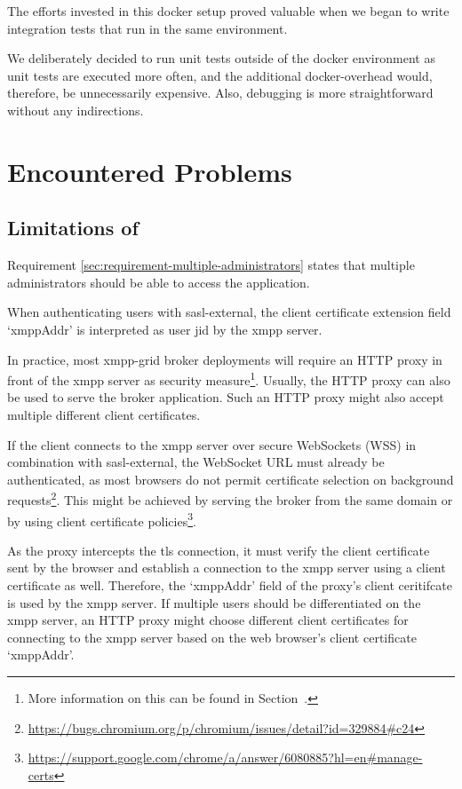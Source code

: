 The efforts invested in this docker setup proved valuable when we began to write integration tests that run in the same environment.

We deliberately decided to run unit tests outside of the docker environment as unit tests are executed more often, and the additional docker-overhead would, therefore, be unnecessarily expensive.
Also, debugging is more straightforward without any indirections.

\section{Encountered Problems}\label{encountered-problems}

\subsection{Limitations of \emph{}}\label{sec:limitations-of-requirement-multiple-administrators}

Requirement \ref{sec:requirement-multiple-administrators} states that multiple administrators should be able to access the application.

When authenticating users with \gls{sasl-external}, the client certificate extension field `xmppAddr' is interpreted as user \gls{jid} by the \gls{xmpp} server.

In practice, most \gls{xmpp-grid} \gls{broker} deployments will require an HTTP proxy in front of the \gls{xmpp} server as security measure\footnote{
More information on this can be found in Section~.}.
Usually, the HTTP proxy can also be used to serve the \gls{broker} application.
Such an HTTP proxy might also accept multiple different client certificates.

If the client connects to the \gls{xmpp} server over secure WebSockets (WSS) in combination with \gls{sasl-external}, the WebSocket URL must already be authenticated, as most browsers do not permit certificate selection on background requests\footnote{\url{https://bugs.chromium.org/p/chromium/issues/detail?id=329884\#c24}}.
This might be achieved by serving the \gls{broker} from the same domain or by using client certificate policies\footnote{\url{https://support.google.com/chrome/a/answer/6080885?hl=en\#manage-certs}}.

As the proxy intercepts the \gls{tls} connection, it must verify the client certificate sent by the browser and establish a connection to the \gls{xmpp} server using a client certificate as well.
Therefore, the `xmppAddr' field of the proxy's client ceritifcate is used by the \gls{xmpp} server.
If multiple users should be differentiated on the \gls{xmpp} server, an HTTP proxy might choose different client certificates for connecting to the \gls{xmpp} server based on the web browser's client certificate `xmppAddr'.


